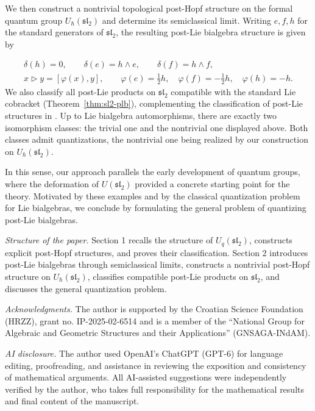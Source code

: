 \documentclass[11pt,english]{article}
\newcommand{\tri}{\mathbin{\triangleright}}
\theoremstyle{definition}
\begin{document}
We then construct a nontrivial topological post-Hopf structure on the formal quantum group $U_\hbar(\mathfrak{sl}_2)$ and determine its semiclassical limit. Writing $e,f,h$ for the standard generators of $\mathfrak{sl}_2$, the resulting post-Lie bialgebra structure is given by

\[
\begin{gathered}
\delta(h)=0,\qquad
\delta(e)=h\wedge e,\qquad
\delta(f)=h\wedge f,\\[3pt]
x\tri y=[\varphi(x),y],
\qquad
\varphi(e)=\frac12h,\quad
\varphi(f)=-\frac12h,\quad
\varphi(h)=-h.
\end{gathered}
\]
We also classify all post-Lie products on
$\mathfrak{sl}_2$ compatible with the standard
Lie cobracket (Theorem~\ref{thm:sl2-plb}),
complementing the classification of post-Lie
structures in \cite{PanLiuBaiGuo}.
Up to Lie bialgebra automorphisms, there are
exactly two isomorphism classes: the trivial one
and the nontrivial one displayed above.
Both classes admit quantizations, the nontrivial
one being realized by our construction on
$U_\hbar(\mathfrak{sl}_2)$.

In this sense, our approach parallels the early development of quantum groups, where the deformation of $U(\mathfrak{sl}_2)$ provided a concrete starting point for the theory. Motivated by these examples and by the classical quantization problem for Lie bialgebras, we conclude by formulating the general problem of quantizing post-Lie bialgebras.

\medskip

\noindent\textit{Structure of the paper.} 
Section 1 recalls the structure of $U_q(\mathfrak{sl}_2)$, constructs explicit post-Hopf structures, and proves their classification. Section 2 introduces post-Lie bialgebras through semiclassical limits, constructs a nontrivial post-Hopf structure on $U_\hbar(\mathfrak{sl}_2)$, classifies compatible post-Lie products on $\mathfrak{sl}_2$, and discusses the general quantization problem.

\medskip

\noindent\textit{Acknowledgments.} 
The author is supported by the Croatian Science Foundation (HRZZ), 
grant no. IP-2025-02-6514 and is a member of the ``National Group for Algebraic and Geometric Structures and their Applications'' (GNSAGA-INdAM). 

\medskip

\noindent\textit{AI disclosure.} 
The author used OpenAI's ChatGPT (GPT-6) for
language editing, proofreading, and assistance
in reviewing the exposition and consistency of
mathematical arguments. All AI-assisted suggestions
were independently verified by the author, who
takes full responsibility for the mathematical
results and final content of the manuscript.
\end{document}
